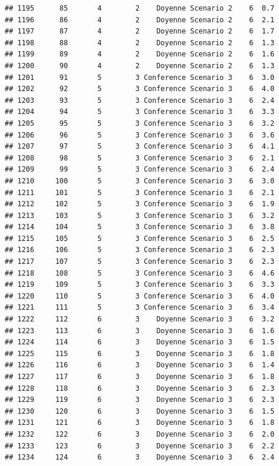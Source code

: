 \documentclass[
]{article}
\begin{document}
\begin{verbatim}
## 1195      85       4        2    Doyenne Scenario 2    6  0.7
## 1196      86       4        2    Doyenne Scenario 2    6  2.1
## 1197      87       4        2    Doyenne Scenario 2    6  1.7
## 1198      88       4        2    Doyenne Scenario 2    6  1.3
## 1199      89       4        2    Doyenne Scenario 2    6  1.6
## 1200      90       4        2    Doyenne Scenario 2    6  1.3
## 1201      91       5        3 Conference Scenario 3    6  3.0
## 1202      92       5        3 Conference Scenario 3    6  4.0
## 1203      93       5        3 Conference Scenario 3    6  2.4
## 1204      94       5        3 Conference Scenario 3    6  3.3
## 1205      95       5        3 Conference Scenario 3    6  3.2
## 1206      96       5        3 Conference Scenario 3    6  3.6
## 1207      97       5        3 Conference Scenario 3    6  4.1
## 1208      98       5        3 Conference Scenario 3    6  2.1
## 1209      99       5        3 Conference Scenario 3    6  2.4
## 1210     100       5        3 Conference Scenario 3    6  3.0
## 1211     101       5        3 Conference Scenario 3    6  2.1
## 1212     102       5        3 Conference Scenario 3    6  1.9
## 1213     103       5        3 Conference Scenario 3    6  3.2
## 1214     104       5        3 Conference Scenario 3    6  3.8
## 1215     105       5        3 Conference Scenario 3    6  2.5
## 1216     106       5        3 Conference Scenario 3    6  2.3
## 1217     107       5        3 Conference Scenario 3    6  2.3
## 1218     108       5        3 Conference Scenario 3    6  4.6
## 1219     109       5        3 Conference Scenario 3    6  3.3
## 1220     110       5        3 Conference Scenario 3    6  4.0
## 1221     111       5        3 Conference Scenario 3    6  3.4
## 1222     112       6        3    Doyenne Scenario 3    6  3.2
## 1223     113       6        3    Doyenne Scenario 3    6  1.6
## 1224     114       6        3    Doyenne Scenario 3    6  1.5
## 1225     115       6        3    Doyenne Scenario 3    6  1.8
## 1226     116       6        3    Doyenne Scenario 3    6  1.4
## 1227     117       6        3    Doyenne Scenario 3    6  1.8
## 1228     118       6        3    Doyenne Scenario 3    6  2.3
## 1229     119       6        3    Doyenne Scenario 3    6  2.3
## 1230     120       6        3    Doyenne Scenario 3    6  1.5
## 1231     121       6        3    Doyenne Scenario 3    6  1.8
## 1232     122       6        3    Doyenne Scenario 3    6  2.0
## 1233     123       6        3    Doyenne Scenario 3    6  2.2
## 1234     124       6        3    Doyenne Scenario 3    6  2.4

\end{verbatim}
\end{document}
